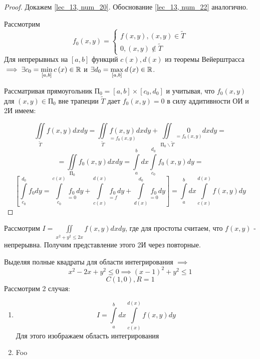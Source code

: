 \documentclass[../../main.tex]{subfiles}
\begin{document}
\begin{proof}
	Докажем \eqref {lec_13, num_20}. Обоснование \eqref {lec_13, num_22}
	аналогично.
	
	Рассмотрим 
	\[ 
	f_0 \left( x, y \right) =  
	\begin{cases}
	f \left( x, y \right),  \left( x, y \right) \in \widetilde{T} \\
	0, \left( x, y \right) \notin \widetilde{T}
	\end{cases}
	\]
	Для непрерывных на $ \left[ a, b \right] $ функций 
	$ c \left( x \right), d \left( x \right) $ из теоремы Вейерштрасса
	$ \implies \exists c_0 = 
	\min\limits_{\left[ a, b \right] } c \left( x \right) \in \mathbb{R} $ и 
	$ \exists d_0 = \max\limits_{\left[a, b \right] } d \left(x\right) \in \mathbb{R} $.
	
	Рассматривая прямоугольник $ \text{П}_0 = \left[ a, b \right] \times 
	\left[ c_0, d_0 \right]  $ и учитывая, что $ f_0 \left( x, y \right) $ для 
	$ \left( x, y \right) \in \text{П}_0 $ вне трапеции $\widetilde{T}$ дает
	$ f_0 \left( x, y \right) = 0 $ в силу аддитивности ОИ и 2И имеем:
	
	\[
	\iint\limits_{ \widetilde{T} } f \left( x, y \right) dx dy = 
	\iint\limits_{ \widetilde{T} } \underset{ = f_0 \left( x, y \right) } 
	{f \left( x, y \right)} dx dy + 
	\iint\limits_{ \text{П}_0 \smallsetminus \widetilde{T} } 
	\underset{ = f_0 \left( x, y \right) }  0 dx dy =
	\]
	\[
	= \iint\limits_{ \text{П}_0} f_0 \left( x, y \right) dx dy = 
	\int\limits_a^b dx
	\int\limits_{c_0}^{d_0} f_0 \left( x, y \right) dy = 
	\]
	\[
	\left[ \int\limits_{c_0}^{d_0} f_0 dy =
	 \int\limits_{c_0} ^ {c \left( x \right) } 
	\underset{ = 0} {f_0} dy + 
	\int\limits_{c \left( x \right) } ^ {d \left( x \right) } 
	\underset{ = f} {f_0} dy +
	 \int\limits_{d \left( x \right) } ^ {d_0} 
	\underset{ = 0} {f_0} dy \right] = 
	\int\limits_a^b dx \int\limits_{c \left( x \right) } ^
	{d \left( x \right) } f \left( x, y \right) dy
	\]
\end{proof}

\begin{exmp}
	Рассмотрим $ I = \iint\limits_{x^2 + y^2 \leq 2x} 
	f \left(x, y \right) dxdy $, 
	где для простоты считаем, что $ f \left( x, y \right) $ - непрерывна. 
	Получим представление этого 2И через повторные.
	
	Выделяя полные квадраты для области интегрирования $ \implies $
	\[
	x^2 -2x + y^2 \leq 0 \implies (x-1)^2 + y^2 \leq 1
	\]
	\[
	C \left( 1, 0 \right), R = 1
	\]
	Рассмотрим 2 случая:
	\begin{enumerate}
		\item   \[ I = \int\limits_a^b dx \int\limits_{c \left( x \right) } ^ 
		 {d \left( x \right) } f \left( x, y \right) dy \]
		 Для этого изображаем область интегрирования
		\item Foo
	\end{enumerate}
\end{exmp}
\end{document}
